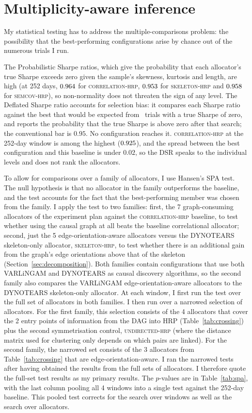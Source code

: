 \documentclass[11pt, a4paper]{report}
\newcommand{\corrhrp}{\textsc{correlation-hrp}}
\newcommand{\skelhrp}{\textsc{skeleton-hrp}}
\newcommand{\undirhrp}{\textsc{undirected-hrp}}
\newcommand{\semcovhrp}{\textsc{semcov-hrp}}
\begin{document}
\section{Multiplicity-aware inference}
\label{sec:multiplicity}

My statistical testing has to address the multiple-comparisons problem: the possibility that the best-performing configurations arise by chance out of the numerous trials I run.

The Probabilistic Sharpe ratios, which give the probability that each allocator's true Sharpe exceeds zero given the sample's skewness, kurtosis and length, are high (at 252 days, $0.964$ for \corrhrp{}, $0.953$ for \skelhrp{} and $0.958$ for \semcovhrp{}), so non-normality does not threaten the sign of any level.
The Deflated Sharpe ratio accounts for selection bias: it compares each Sharpe ratio against the best that would be expected from \rsNtrials\ trials with a true Sharpe of zero, and reports the probability that the true Sharpe is above zero after that search; the conventional bar is $0.95$. No configuration reaches it. \corrhrp{} at the 252-day window is among the highest ($0.925$), and the spread between the best configuration and this baseline is under $0.02$, so the DSR speaks to the individual levels and does not rank the allocators.

To allow for comparisons over a family of allocators, I use Hansen's SPA test.
The null hypothesis is that no allocator in the family outperforms the baseline, and the test accounts for the fact that the best-performing member was chosen from the family.
I apply the test to two
families: first, the 7 graph-consuming allocators of the experiment plan against the \corrhrp{} baseline, to test whether using the causal graph at all beats the baseline correlational allocator; second, just the 5 edge-orientation-aware allocators versus the DYNOTEARS skeleton-only allocator, \skelhrp{}, to test whether there is an additional gain from the graph's edge orientations above that of the skeleton (Section~\ref{sec:decomposition}).
Both families contain configurations that use both VARLiNGAM and DYNOTEARS as causal discovery algorithms, so the second family also compares the VARLiNGAM edge-orientation-aware allocators to the DYNOTEARS skeleton-only allocator.
At each window, I first run the test over the full set of allocators in both families. I then run over a narrowed selection of allocators. For the first family, this selection consists of the 4 allocators that cover the 2 entry points of information from the DAG
into HRP (Table~\ref{tab:crossing}) plus the second symmetrisation control, \undirhrp{} (where the distance matrix used for clustering only depends on which pairs are linked).
For the second family, the narrowed set consists of the 3 allocators from Table~\ref{tab:crossing} that are edge-orientation-aware.
I ran the narrowed tests after having obtained the results from the full sets of allocators. I therefore quote the full-set test results as my primary results. The $p$-values are in Table~\ref{tab:spa}, with the last column pooling all 4 windows into a single test against the 252-day baseline. This pooled test corrects for the search over windows as well as the search over allocators.
\end{document}
